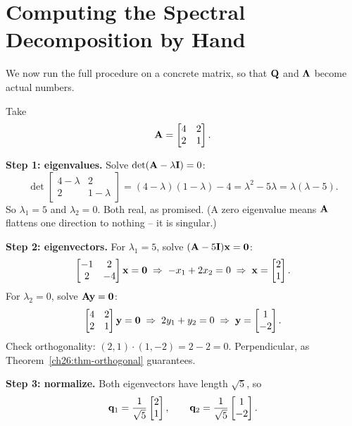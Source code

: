 \section{Computing the Spectral Decomposition by Hand}
\label{ch26:computing}

We now run the full procedure on a concrete matrix, so that $\mathbf{Q}$ and
$\mathbf{\Lambda}$ become actual numbers.

\begin{example}
\label{ch26:ex-full-2x2}
Take
\[
  \mathbf{A} = \begin{bmatrix} 4 & 2 \\ 2 & 1 \end{bmatrix}.
\]

\textbf{Step 1: eigenvalues.} Solve $\det(\mathbf{A}-\lambda\mathbf{I})=0$:
\[
  \det\begin{bmatrix} 4-\lambda & 2 \\ 2 & 1-\lambda \end{bmatrix}
  = (4-\lambda)(1-\lambda) - 4
  = \lambda^2 - 5\lambda = \lambda(\lambda - 5).
\]
So $\lambda_1 = 5$ and $\lambda_2 = 0$. Both real, as promised. (A zero
eigenvalue means $\mathbf{A}$ flattens one direction to nothing -- it is singular.)

\textbf{Step 2: eigenvectors.} For $\lambda_1 = 5$, solve $(\mathbf{A}-5\mathbf{I})\mathbf{x}=\mathbf{0}$:
\[
  \begin{bmatrix} -1 & 2 \\ 2 & -4 \end{bmatrix}\mathbf{x}=\mathbf{0}
  \;\Rightarrow\; -x_1 + 2x_2 = 0 \;\Rightarrow\; \mathbf{x}=\begin{bmatrix}2\\1\end{bmatrix}.
\]
For $\lambda_2 = 0$, solve $\mathbf{A}\mathbf{y}=\mathbf{0}$:
\[
  \begin{bmatrix} 4 & 2 \\ 2 & 1 \end{bmatrix}\mathbf{y}=\mathbf{0}
  \;\Rightarrow\; 2y_1 + y_2 = 0 \;\Rightarrow\; \mathbf{y}=\begin{bmatrix}1\\-2\end{bmatrix}.
\]
Check orthogonality: $(2,1)\cdot(1,-2) = 2 - 2 = 0$. Perpendicular, as
Theorem~\ref{ch26:thm-orthogonal} guarantees.

\textbf{Step 3: normalize.} Both eigenvectors have length $\sqrt{5}$, so
\[
  \mathbf{q}_1 = \frac{1}{\sqrt5}\begin{bmatrix}2\\1\end{bmatrix},\qquad
  \mathbf{q}_2 = \frac{1}{\sqrt5}\begin{bmatrix}1\\-2\end{bmatrix}.
\]


\end{example}
